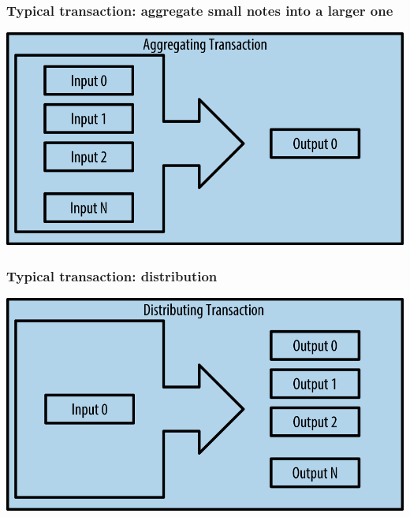 \documentclass[11pt]{beamer}  %
\begin{document}
\begin{frame}\frametitle{Typical transaction: aggregate small notes into a larger one}

  \begin{center}
    \includegraphics[scale=1.2,clip=false]{pictures/mbc2_0206.png}
  \end{center}

\end{frame}

\begin{frame}\frametitle{Typical transaction: distribution}

  \begin{center}
    \includegraphics[scale=1.2,clip=false]{pictures/mbc2_0207.png}
  \end{center}

\end{frame}
\end{document}
